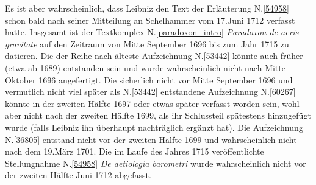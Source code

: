 Es ist aber wahrscheinlich, dass Leibniz den Text der Erläuterung N.\;\ref{54958} schon bald nach seiner Mitteilung an Schelhammer vom 17.\;Juni 1712 verfasst hatte.\cite{01463}
\pend%
\pstart%
Insgesamt ist der Textkomplex N.\;\ref{paradoxon_intro} \textit{Paradoxon de aeris gravitate} auf den Zeitraum von Mitte September 1696 bis zum Jahr 1715 zu datieren.
Die der Reihe nach älteste Aufzeichnung N.\;\ref{53442} könnte auch früher (etwa ab 1689) entstanden sein und wurde wahrscheinlich nicht nach Mitte Oktober 1696 angefertigt.
Die sicherlich nicht vor Mitte September 1696 und vermutlich nicht viel später als N.\;\ref{53442} entstandene Aufzeichnung N.\;\ref{60267} könnte in der zweiten Hälfte 1697 oder etwas später verfasst worden sein, wohl aber nicht nach der zweiten Hälfte 1699, als ihr Schlussteil spätestens hinzugefügt wurde (falls Leibniz ihn überhaupt nachträglich ergänzt hat).
Die Aufzeichnung N.\;\ref{36805} entstand nicht vor der zweiten Hälfte 1699 und wahrscheinlich nicht nach dem 19.\;März 1701.
Die im Laufe des Jahres 1715 veröffentlichte Stellungnahme N.\;\ref{54958} \textit{De aetiologia barometri} wurde wahrscheinlich nicht vor der zweiten Hälfte Juni 1712 abgefasst.
\pend%
%
\frenchspacing%
\normalsize%
